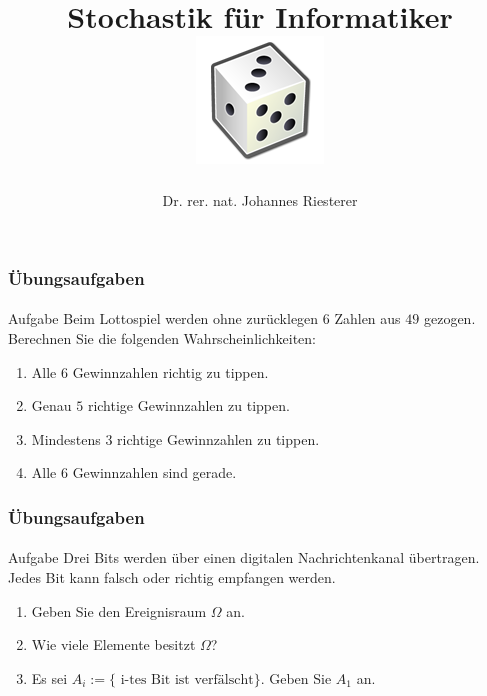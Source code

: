 \documentclass{beamer}
\begin{document}
\title[Stochastik] %
{Stochastik für Informatiker
\\
\includegraphics[scale=0.5]{img/craps}
}
\subtitle{}
\author[Dr. Johannes Riesterer] %
{Dr.  rer. nat. Johannes Riesterer}

\date[KPT 2004] %
{}

\subject{Stochastik}

\frame{\titlepage}

\begin{frame}
    \frametitle{Übungsaufgaben}
\framesubtitle{}
\begin{block}{Aufgabe}
Beim Lottospiel werden ohne zurücklegen $6$ Zahlen aus $49$ gezogen. Berechnen Sie die folgenden Wahrscheinlichkeiten:
\begin{enumerate}
\item Alle $6$ Gewinnzahlen richtig zu tippen.
\item Genau $5$ richtige Gewinnzahlen zu tippen.
\item Mindestens $3$ richtige Gewinnzahlen zu tippen.
\item Alle $6$ Gewinnzahlen sind gerade.
\end{enumerate}
\end{block}
 \end{frame}



\begin{frame}
    \frametitle{Übungsaufgaben}
\framesubtitle{}
\begin{block}{Aufgabe}
Drei Bits werden über einen digitalen Nachrichtenkanal übertragen. Jedes Bit kann falsch oder richtig empfangen werden.
\begin{enumerate}
\item Geben Sie den Ereignisraum $\Omega$ an.
\item Wie viele Elemente besitzt $\Omega$?
\item Es sei $A_i := \{ \text{ i-tes Bit ist verfälscht}\}$. Geben Sie $A_1$ an.
\end{enumerate}
\end{block}

 \end{frame}
\end{document}
